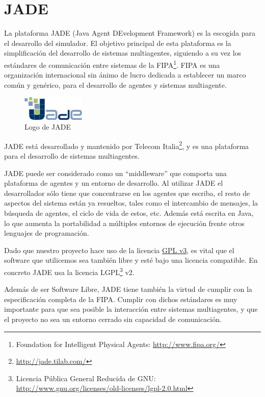 \section{JADE}

La plataforma JADE (Java Agent DEvelopment Framework) es la escogida para el
desarrollo del simulador. El objetivo principal de esta plataforma es la
simplificación del desarrollo de sistemas multiagentes, siguiendo a su vez los
estándares de comunicación entre sistemas de la FIPA\footnote{Foundation for
Intelligent Physical Agents: \url{http://www.fipa.org/}}. FIPA es una
organización internacional sin ánimo de lucro dedicada a establecer un marco
común y genérico, para el desarrollo de agentes y sistemas multiagente.

\begin{figure}[H]
 \centering
 \includegraphics[width=30mm]{figuras/cap4/jade.png}
 \caption{Logo de JADE}
\end{figure}

JADE está desarrollado y mantenido por Telecom
Italia\footnote{\url{http://jade.tilab.com/}}, y es una plataforma para el
desarrollo de sistemas multiagentes.

JADE puede ser considerado como un ``middleware'' que comporta una plataforma de
agentes y un entorno de desarrollo. Al utilizar JADE el desarrollador sólo tiene
que concentrarse en los agentes que escriba, el resto de aspectos del sistema
están ya resueltos, tales como el intercambio de mensajes, la búsqueda de
agentes, el ciclo de vida de estos, etc. Además está escrita en Java, lo que
aumenta la portabilidad a múltiples entornos de ejecución frente otros lenguajes
de programación.

Dado que nuestro proyecto hace uso de la licencia \hyperref[ap1]{GPL v3}, es
vital que el software que utilicemos sea también libre y esté bajo una licencia
compatible. En concreto JADE usa la licencia LGPL\footnote{Licencia Pública
General Reducida de GNU:
\url{http://www.gnu.org/licenses/old-licenses/lgpl-2.0.html}} v2.

Además de ser Software Libre, JADE tiene también la virtud de cumplir con la
especificación completa de la FIPA. Cumplir con dichos estándares es muy
importante para que sea posible la interacción entre sistemas multiagentes, y
que el proyecto no sea un entorno cerrado sin capacidad de comunicación.

